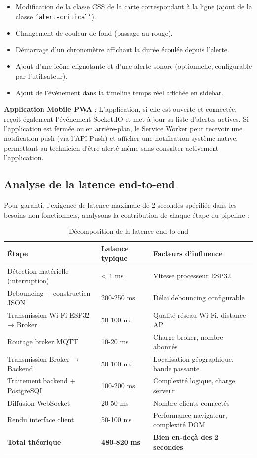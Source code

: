 \begin{itemize}
    \item Modification de la classe CSS de la carte correspondant à la ligne (ajout de la classe \texttt{'alert-critical'}).
    \item Changement de couleur de fond (passage au rouge).
    \item Démarrage d'un chronomètre affichant la durée écoulée depuis l'alerte.
    \item Ajout d'une icône clignotante et d'une alerte sonore (optionnelle, configurable par l'utilisateur).
    \item Ajout de l'événement dans la timeline temps réel affichée en sidebar.
\end{itemize}

\textbf{Application Mobile PWA} : L'application, si elle est ouverte et connectée, reçoit également l'événement Socket.IO et met à jour sa liste d'alertes actives. Si l'application est fermée ou en arrière-plan, le Service Worker peut recevoir une notification push (via l'API Push) et afficher une notification système native, permettant au technicien d'être alerté même sans consulter activement l'application.


\subsection{Analyse de la latence end-to-end}

Pour garantir l'exigence de latence maximale de 2 secondes spécifiée dans les besoins non fonctionnels, analysons la contribution de chaque étape du pipeline :

\begin{table}[htbp]
\centering
\small
\caption{Décomposition de la latence end-to-end}
\label{tab:latency_breakdown}
\begin{tabular}{|p{5cm}|p{3cm}|p{5cm}|}
\hline
\rowcolor{sewesblu!20}
\textbf{Étape} & \textbf{Latence typique} & \textbf{Facteurs d'influence} \\
\hline
Détection matérielle (interruption) & < 1 ms & Vitesse processeur ESP32 \\
\hline
Debouncing + construction JSON & 200-250 ms & Délai debouncing configurable \\
\hline
Transmission Wi-Fi ESP32 → Broker & 50-100 ms & Qualité réseau Wi-Fi, distance AP \\
\hline
Routage broker MQTT & 10-20 ms & Charge broker, nombre abonnés \\
\hline
Transmission Broker → Backend & 50-100 ms & Localisation géographique, bande passante \\
\hline
Traitement backend + PostgreSQL & 100-200 ms & Complexité logique, charge serveur \\
\hline
Diffusion WebSocket & 20-50 ms & Nombre clients connectés \\
\hline
Rendu interface client & 50-100 ms & Performance navigateur, complexité DOM \\
\hline
\rowcolor{green!10}
\textbf{Total théorique} & \textbf{480-820 ms} & \textbf{Bien en-deçà des 2 secondes} \\
\hline
\end{tabular}
\end{table}


